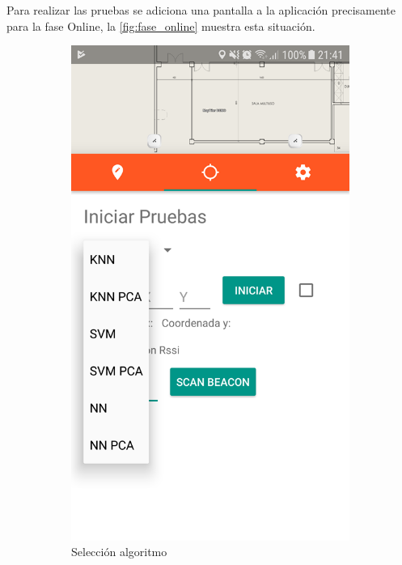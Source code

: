 Para realizar las pruebas se adiciona una pantalla a la aplicación precisamente para la fase Online, la \autoref{fig:fase_online} muestra esta situación.

\begin{figure}[ht!]
\centering
\begin{subfigure}{.3\textwidth}
  \centering
  \includegraphics[width=.8\linewidth]{figures/fase_online1.png}
  \caption{Selección algoritmo}
  \label{fig:online1}
\end{subfigure}%
\begin{subfigure}{.3\textwidth}
  \centering

\end{subfigure}
\end{figure}
